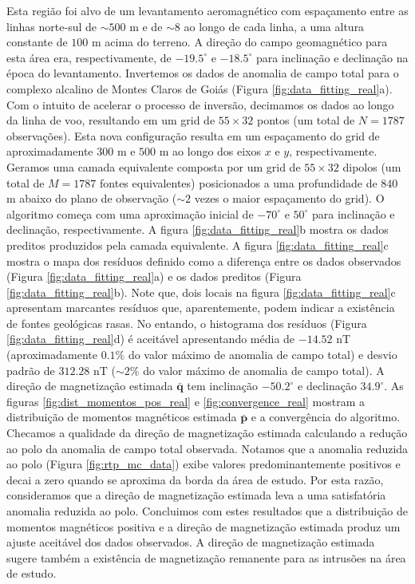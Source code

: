Esta região foi alvo de um levantamento aeromagnético com espaçamento entre as linhas norte-sul de $\sim 500$ m e de $\sim 8$ ao longo de cada linha, a uma altura constante de $100$ m acima do terreno. A direção do campo geomagnético para esta área era, respectivamente, de $-19.5^\circ$ e $-18.5^\circ$ para inclinação e declinação na época do levantamento. Invertemos os dados de anomalia de campo total para o complexo alcalino de Montes Claros de Goiás (Figura \ref{fig:data_fitting_real}a). Com o intuito de acelerar o processo de inversão, decimamos os dados ao longo da linha de voo, resultando em um grid de $55 \times 32$ pontos (um total de $N=1787$ observações). Esta nova configuração resulta em um espaçamento do grid de aproximadamente $300$ m e $500$ m ao longo dos eixos $x$ e $y$, respectivamente. Geramos uma camada equivalente composta por um grid de $55 \times 32$ dipolos (um total de $M=1787$ fontes equivalentes) posicionados a uma profundidade de $840$ m abaixo do plano de observação ($\sim 2$ vezes o maior espaçamento do grid). O algoritmo começa com uma aproximação inicial de $-70^\circ$ e $50^\circ$ para inclinação e declinação, respectivamente. A figura \ref{fig:data_fitting_real}b mostra os dados preditos produzidos pela camada equivalente. A figura \ref{fig:data_fitting_real}c mostra o mapa dos resíduos definido como a diferença entre os dados observados (Figura \ref{fig:data_fitting_real}a) e os dados preditos (Figura \ref{fig:data_fitting_real}b). Note que, dois locais na figura \ref{fig:data_fitting_real}c apresentam marcantes resíduos que, aparentemente, podem indicar a existência de fontes geológicas rasas. No entando, o histograma dos resíduos (Figura \ref{fig:data_fitting_real}d) é aceitável apresentando média de $-14.52$ nT (aproximadamente $0.1\% $ do valor máximo de anomalia de campo total) e desvio padrão de $312.28$ nT ($\sim 2 \% $ do valor máximo de anomalia de campo total). A direção de magnetização estimada $\bar{\mathbf{q}}$ tem inclinação $-50.2^\circ$ e declinação $34.9^\circ$. As figuras \ref{fig:dist_momentos_pos_real} e \ref{fig:convergence_real} mostram a distribuição de momentos magnéticos estimada $\bar{\mathbf{p}}$ e a convergência do algoritmo. Checamos a qualidade da direção de magnetização estimada calculando a redução ao polo da anomalia de campo total observada. Notamos que a anomalia reduzida ao polo (Figura \ref{fig:rtp_mc_data}) exibe valores predominantemente positivos e decai a zero quando se aproxima da borda da área de estudo. Por esta razão, consideramos que a direção de magnetização estimada leva a uma satisfatória anomalia reduzida ao polo. Concluimos com estes resultados que a distribuição de momentos magnéticos positiva e a direção de magnetização estimada produz um ajuste aceitável dos dados observados. A direção de magnetização estimada sugere também a existência de magnetização remanente para as intrusões na área de estudo.  

